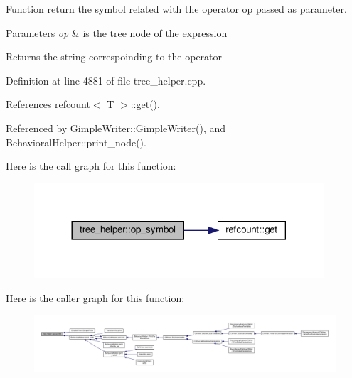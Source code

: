 Function return the symbol related with the operator op passed as parameter. 


\begin{DoxyParams}{Parameters}
{\em op} & is the tree node of the expression \\
\hline
\end{DoxyParams}
\begin{DoxyReturn}{Returns}
the string correspoinding to the operator 
\end{DoxyReturn}


Definition at line 4881 of file tree\+\_\+helper.\+cpp.



References refcount$<$ T $>$\+::get().



Referenced by Gimple\+Writer\+::\+Gimple\+Writer(), and Behavioral\+Helper\+::print\+\_\+node().

Here is the call graph for this function\+:
\nopagebreak
\begin{figure}[H]
\begin{center}
\leavevmode
\includegraphics[width=305pt]{d7/d99/classtree__helper_afe92ad7fb9854908aa7b11f4bdb89e67_cgraph}
\end{center}
\end{figure}
Here is the caller graph for this function\+:
\nopagebreak
\begin{figure}[H]
\begin{center}
\leavevmode
\includegraphics[width=350pt]{d7/d99/classtree__helper_afe92ad7fb9854908aa7b11f4bdb89e67_icgraph}
\end{center}
\end{figure}
\mbox{\label{classtree__helper_a3bddb21e3d1fd325d9949e94c3e84381}} 
